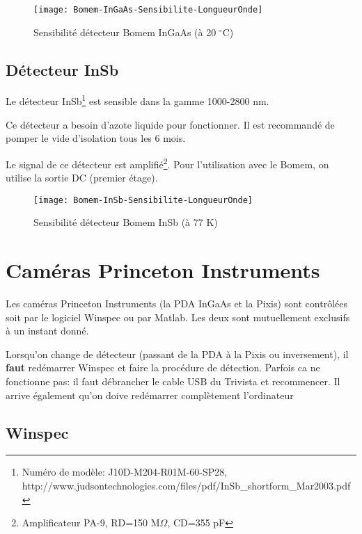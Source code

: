 \documentclass[11pt,francais]{book} %
\begin{document}
\begin{figure}[h]
  \centering\texttt{[image: Bomem-InGaAs-Sensibilite-LongueurOnde]}
  \caption{Sensibilité détecteur Bomem InGaAs (à 20 $^{\circ}$C)}
  \label{fig:pdaingaas}
\end{figure}



\subsection{Détecteur InSb}
Le détecteur InSb\footnote{Numéro de modèle: J10D-M204-R01M-60-SP28, http://www.judsontechnologies.com/files/pdf/InSb\_shortform\_Mar2003.pdf} est sensible dans la gamme 1000-2800 nm.

Ce détecteur a besoin d'azote liquide pour fonctionner.
Il est recommandé de pomper le vide d'isolation tous les 6 mois.

Le signal de ce détecteur est amplifié\footnote{Amplificateur PA-9, RD=150 M$\Omega$, CD=355 pF}.
Pour l'utilisation avec le Bomem, on utilise la sortie DC (premier étage).

\begin{figure}[h]
  \centering\texttt{[image: Bomem-InSb-Sensibilite-LongueurOnde]}
  \caption{Sensibilité détecteur Bomem InSb (à 77 K)}
  \label{fig:pdaingaas}
\end{figure}



\section{Caméras Princeton Instruments}

Les caméras Princeton Instruments (la PDA InGaAs et la Pixis) sont contrôlées soit par le logiciel Winspec ou par Matlab.
Les deux sont mutuellement exclusifs à un instant donné.

Lorsqu'on change de détecteur (passant de la PDA à la Pixis ou inversement), il {\bf faut} redémarrer Winspec et faire la procédure de détection.
Parfois ca ne fonctionne pas: il faut débrancher le cable USB du Trivista et recommencer.
Il arrive également qu'on doive redémarrer complètement l'ordinateur

\subsection{Winspec}
\end{document}
